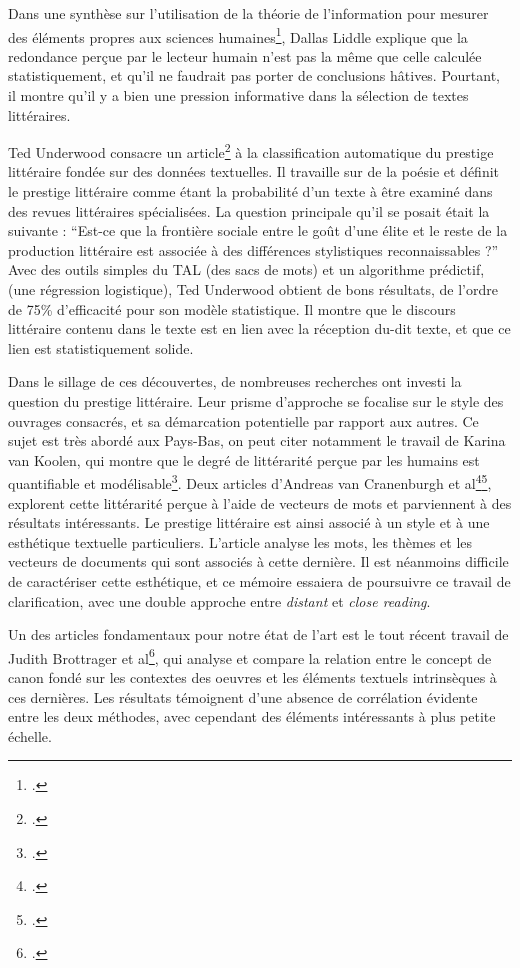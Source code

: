 Dans une synthèse sur l'utilisation de la théorie de l'information pour mesurer des éléments propres aux sciences humaines\footcites{liddle_could_2019}, Dallas Liddle explique que la redondance perçue par le lecteur humain n'est pas la même que celle calculée statistiquement, et qu'il ne faudrait pas porter de conclusions hâtives. Pourtant, il montre qu'il y a bien une pression informative dans la sélection de textes littéraires.

Ted Underwood consacre un article\footcites{underwood_longue_2016} à la classification automatique du prestige littéraire fondée sur des données textuelles. Il travaille sur de la poésie et définit le prestige littéraire comme étant la probabilité d'un texte à être examiné dans des revues littéraires spécialisées. La question principale qu'il se posait était la suivante : \enquote{Est-ce que la frontière sociale entre le goût d'une élite et le reste de la production littéraire est associée à des différences stylistiques reconnaissables ?} Avec des outils simples du TAL (des sacs de mots) et un algorithme prédictif, (une régression logistique), Ted Underwood obtient de bons résultats, de l'ordre de 75\% d'efficacité pour son modèle statistique. Il montre que le discours littéraire contenu dans le texte est en lien avec la réception du-dit texte, et que ce lien est statistiquement solide.

Dans le sillage de ces découvertes, de nombreuses recherches ont investi la question du prestige littéraire. Leur prisme d'approche se focalise sur le style des ouvrages consacrés, et sa démarcation potentielle par rapport aux autres. Ce sujet est très abordé aux Pays-Bas, on peut citer notamment le travail de Karina van Koolen, qui montre que le degré de littérarité perçue par les humains est quantifiable et modélisable\footcites{koolen_literary_2020}. Deux articles d'Andreas van Cranenburgh et al\footcites{van_cranenburgh_vector_2019}\footcites{van_cranenburgh_data-oriented_2017}, explorent cette littérarité perçue à l'aide de vecteurs de mots et parviennent à des résultats intéressants. Le prestige littéraire est ainsi associé à un style et à une esthétique textuelle particuliers. L'article analyse les mots, les thèmes et les vecteurs de documents qui sont associés à cette dernière. Il est néanmoins difficile de caractériser cette esthétique, et ce mémoire essaiera de poursuivre ce travail de clarification, avec une double approche entre \textit{distant} et \textit{close reading}.

Un des articles fondamentaux pour notre état de l'art est le tout récent travail de Judith Brottrager et al\footcites{brottrager_predicting_2021}, qui analyse et compare la relation entre le concept de canon fondé sur les contextes des oeuvres et les éléments textuels intrinsèques à ces dernières. Les résultats témoignent d'une absence de corrélation évidente entre les deux méthodes, avec cependant des éléments intéressants à plus petite échelle.

